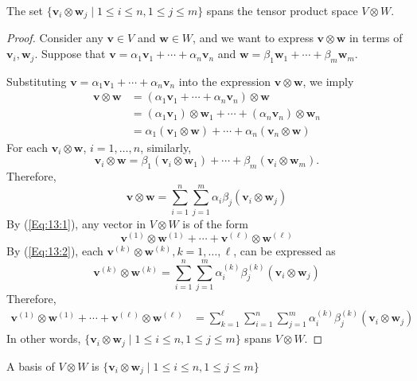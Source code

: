 \begin{proposition}\label{pro:13:1}
The set 
$\{\bm v_i\otimes\bm w_j\mid 1\le i\le n, 1\le j\le m\}$
spans 
the tensor product space
$V\otimes W$.
\end{proposition}
\begin{proof}
Consider any $\bm v\in V$ and $\bm w\in W$, and we want to express $\bm v\otimes\bm w$ in terms of $\bm v_i,\bm w_j$.
Suppose that
$\bm v=\alpha_1\bm v_1+\cdots+\alpha_n\bm v_n$ and $\bm w=\beta_1\bm w_1+\cdots+\beta_m\bm w_m$.

Substituting $\bm v=\alpha_1\bm v_1+\cdots+\alpha_n\bm v_n$ into the expression 
$\bm v\otimes\bm w$, we imply
\begin{align*}
\bm v\otimes\bm w&=
(\alpha_1\bm v_1+\cdots+\alpha_n\bm v_n)\otimes\bm w\\
&=(\alpha_1\bm v_1)\otimes\bm w_1
+
\cdots
+
(\alpha_n\bm v_n)\otimes\bm w_n\\
&=\alpha_1(\bm v_1\otimes\bm w)
+
\cdots
+
\alpha_n(\bm v_n\otimes\bm w)
\end{align*}
For each $\bm v_i\otimes\bm w$, $i=1,\dots,n$, similarly, 
\begin{equation*}
\bm v_i\otimes\bm w
=
\beta_1(\bm v_i\otimes\bm w_1)
+
\cdots
+
\beta_m(\bm v_i\otimes\bm w_m).
\end{equation*}
Therefore, 
\begin{equation}\label{Eq:13:2}
\bm v\otimes\bm w
=
\sum_{i=1}^n\sum_{j=1}^m
\alpha_i\beta_j
(\bm v_i\otimes\bm w_j)
\end{equation}
By (\ref{Eq:13:1}), any vector in $V\otimes W$ is of the form 
\[
\bm v^{(1)}\otimes\bm w^{(1)}+\cdots
+
\bm v^{(\ell)}\otimes\bm w^{(\ell)}
\]
By (\ref{Eq:13:2}), each $\bm v^{(k)}\otimes\bm w^{(k)}, k=1,\dots,\ell$,
can be expressed as
\[
\bm v^{(k)}\otimes\bm w^{(k)}
=
\sum_{i=1}^n\sum_{j=1}^m
\alpha_i^{(k)}\beta_j^{(k)}(\bm v_i\otimes\bm w_j)
\]
Therefore,
\begin{align*}
\bm v^{(1)}\otimes\bm w^{(1)}+\cdots
+
\bm v^{(\ell)}\otimes\bm w^{(\ell)}
&=
\sum_{k=1}^\ell\sum_{i=1}^n\sum_{j=1}^m\alpha_i^{(k)}\beta_j^{(k)}(\bm v_i\otimes\bm w_j)
\end{align*}
In other words, $\{\bm v_i\otimes\bm w_j\mid 1\le i\le n, 1\le j\le m\}$ spans $V\otimes W$.
\end{proof}

\begin{theorem}
A basis of $V\otimes W$ is $\{\bm v_i\otimes\bm w_j\mid 1\le i\le n, 1\le j\le m\}$
\end{theorem}

